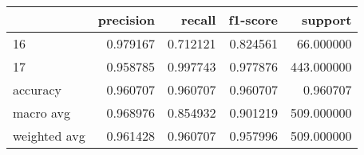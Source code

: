 \begin{tabular}{lrrrr}
\toprule
 & precision & recall & f1-score & support \\
\midrule
16 & 0.979167 & 0.712121 & 0.824561 & 66.000000 \\
17 & 0.958785 & 0.997743 & 0.977876 & 443.000000 \\
accuracy & 0.960707 & 0.960707 & 0.960707 & 0.960707 \\
macro avg & 0.968976 & 0.854932 & 0.901219 & 509.000000 \\
weighted avg & 0.961428 & 0.960707 & 0.957996 & 509.000000 \\
\bottomrule
\end{tabular}
